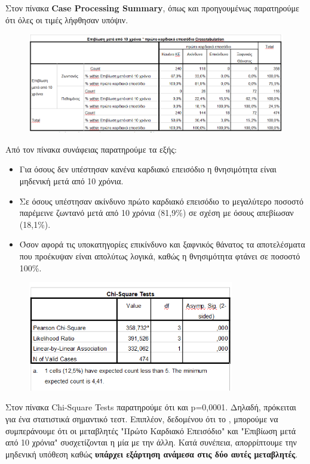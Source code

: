 Στον πίνακα \textbf{Case Processing Summary}, όπως και προηγουμένως παρατηρούμε ότι όλες οι τιμές λήφθησαν υπόψιν.
\clearpage

\begin{figure}[h]
    \centering
    \includegraphics[width=\textwidth]{images/104.PNG}
\end{figure}

Από τον πίνακα συνάφειας παρατηρούμε τα εξής:
\begin{itemize}
    \item Για όσους δεν υπέστησαν κανένα καρδιακό επεισόδιο η θνησιμότητα είναι μηδενική μετά από 10 χρόνια. 
    \item Σε όσους υπέστησαν ακίνδυνο πρώτο καρδιακό επεισόδιο το μεγαλύτερο ποσοστό παρέμεινε ζωντανό μετά από 10 χρόνια (81,9\%) σε σχέση με όσους απεβίωσαν (18,1\%).
    \item Όσον αφορά τις υποκατηγορίες επικίνδυνο και ξαφνικός θάνατος τα αποτελέσματα που προέκυψαν είναι απολύτως λογικά, καθώς η θνησιμότητα φτάνει σε ποσοστό 100\%.
\end{itemize}

\begin{figure}[h]
    \centering
    \includegraphics[width=0.8\textwidth]{images/105.PNG}
\end{figure}

Στον πίνακα Chi-Square Tests παρατηρούμε ότι  και p=0,0001. Δηλαδή, πρόκειται για ένα στατιστικά σημαντικό τεστ. Επιπλέον, δεδομένου ότι το , μπορούμε να συμπεράνουμε ότι οι μεταβλητές  "Πρώτο Καρδιακό Επεισόδιο" και "Επιβίωση μετά από 10 χρόνια" συσχετίζονται η μία με την άλλη. Κατά συνέπεια, απορρίπτουμε την μηδενική υπόθεση καθώς \textbf{υπάρχει εξάρτηση ανάμεσα στις δύο αυτές μεταβλητές}.

